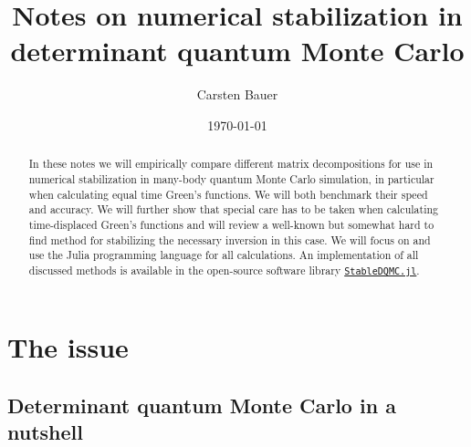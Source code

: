 \documentclass[%
 reprint,
superscriptaddress,
citeautoscript,
showpacs,
 amsmath,amssymb,
 aps,
 prb,
longbibliography,
]{revtex4-1}
\begin{document}
\title{Notes on numerical stabilization in determinant quantum Monte Carlo}%

\author{Carsten Bauer}

\date{\today}%

\begin{abstract}
In these notes we will empirically compare different matrix decompositions for use in numerical stabilization in many-body quantum Monte Carlo simulation, in particular when calculating equal time Green's functions. We will both benchmark their speed and accuracy. We will further show that special care has to be taken when calculating time-displaced Green's functions and will review a well-known but somewhat hard to find method for stabilizing the necessary inversion in this case. We will focus on and use the Julia programming language for all calculations. An implementation of all discussed methods is available in the open-source software library \href{http://github.com/crstnbr/StableDQMC.jl}{\texttt{StableDQMC.jl}}.
\end{abstract}


\maketitle


\section{\label{sec:why}The issue}

\subsection{Determinant quantum Monte Carlo in a nutshell}
\end{document}
